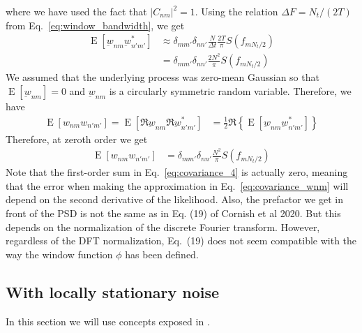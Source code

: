 \documentclass{article}
\begin{document}
where we have used the fact that $|C_{n m}|^{2} = 1$. Using the relation $\Delta F = N_t / (2 T)$ from Eq.~\eqref{eq:window_bandwidth}, we get
\begin{align}
\label{eq:covariance_order_0_diag2}
    \operatorname{E}\left[\underbar{w}_{nm} \underbar{w}_{n'm'}^{\ast}\right] & \approx \delta_{m m'} \delta_{n n'} \frac{N}{\Delta t}\frac{2T}{\pi}   S\left(f_{m N_t / 2}\right) \nonumber \\
    & = \delta_{m m'} \delta_{n n'}  \frac{2 N^2}{\pi}  S\left(f_{m N_t / 2}\right) \nonumber
\end{align}
We assumed that the underlying process was zero-mean Gaussian so that $\operatorname{E}[\underbar{w}_{nm}] = 0$ and $\underbar{w}_{nm}$ is a circularly symmetric random variable. Therefore, we have 
\begin{align}
   \operatorname{E}\left[w_{nm} w_{n'm'}\right] =  \operatorname{E}\left[\Re \underbar{w}_{nm} \Re \underbar{w}_{n'm'}^{\ast}\right] & = \frac{1}{2} \Re \left\{ \operatorname{E}\left[\underbar{w}_{nm} \underbar{w}_{n'm'}^{\ast}\right] \right\}
\end{align}
Therefore, at zeroth order we get 
\begin{align}
\label{eq:covariance_wnm}
   \operatorname{E}\left[w_{nm} w_{n'm'}\right] & =  \delta_{m m'} \delta_{n n'}  \frac{N^2}{\pi}  S\left(f_{m N_t / 2}\right)
\end{align}
Note that the first-order sum in Eq.~\eqref{eq:covariance_4} is actually zero, meaning that the error when making the approximation in Eq.~\eqref{eq:covariance_wnm} will depend on the second derivative of the likelihood. Also, the prefactor we get in front of the PSD is not the same as in Eq. (19) of Cornish et al 2020. But this depends on the normalization of the discrete Fourier transform. However, regardless of the DFT normalization, Eq.~(19) does not seem compatible with the way the window function $\phi$ has been defined.

\subsection{With locally stationary noise}

In this section we will use concepts exposed in \cite{mallat_adaptive_1998}.
\end{document}
